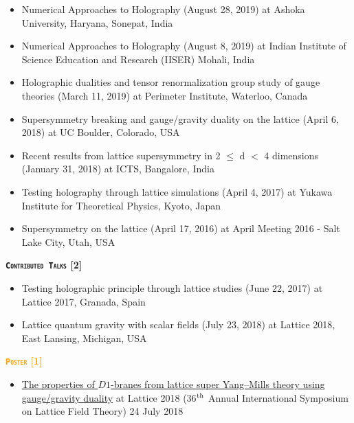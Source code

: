 \begin{itemize}
 \href{https://rgjha.github.io/talks/cs2020.pdf}{{\texttt{\COL{[Lecture 1 \& 2]}}}} 
 \item Numerical Approaches to Holography (August 28, 2019) at Ashoka University, Haryana, Sonepat, India
 \href{https://rgjha.github.io/talks/Talk_v1.pdf}{{\texttt{}}} 
 \item Numerical Approaches to Holography (August 8, 2019) at Indian Institute of Science Education and Research (IISER) Mohali, India
  \item Holographic dualities and tensor renormalization group study of gauge theories (March 11, 2019) at Perimeter Institute, Waterloo, Canada 
  \href{https://pirsa.org/19030108}
{{\texttt{}}} 
  \item Supersymmetry breaking and gauge/gravity duality on the lattice (April 6, 2018) at UC Boulder, Colorado, USA \href{https://rgjha.github.io/talks/lbsm18_jha.pdf}{{\texttt{}}} 
  \item Recent results from lattice supersymmetry in 2 $\le$ d $<$ 4 dimensions (January 31, 2018) at ICTS, Bangalore, India \href{https://www.youtube.com/watch?v=Zey6DAEiw0c}{{\texttt{}}} 
 \item Testing holography through lattice simulations (April 4, 2017) at Yukawa Institute for Theoretical Physics, Kyoto, Japan
 \href{https://rgjha.github.io/talks/kyoto_v1.pdf}{{\texttt{\COL{[PDF]}}}}
\item Supersymmetry on the lattice (April 17, 2016) at April Meeting 2016 - Salt Lake City, Utah, USA
\href{https://rgjha.github.io/talks/aps_april.pdf}{{\texttt{}}} 
\end{itemize}

\textcolor{bittersweet}{\textbf{\textsc{\fontsize{12}{48} \bfseries \texttt{Contributed Talks} [2]}}}
\begin{itemize}
  \item Testing holographic principle through lattice studies (June 22, 2017) at Lattice 2017, Granada, Spain
  \item Lattice quantum gravity with scalar fields (July 23, 2018) at Lattice 2018, East Lansing, Michigan, USA   
\end{itemize}
 

\textcolor{orange}{\textbf{\textsc{\fontsize{12}{48} \bfseries \texttt{Poster} [1]}}}
  \begin{itemize}
 \item \href{https://indico.fnal.gov/event/15949/session/4/contribution/66}{The properties of $D1$-branes from lattice super Yang--Mills theory using gauge/gravity duality} at Lattice 2018 (36$^{\rm{th}}$ Annual International Symposium on Lattice Field Theory) \hfill 24 July 2018
\end{itemize}
